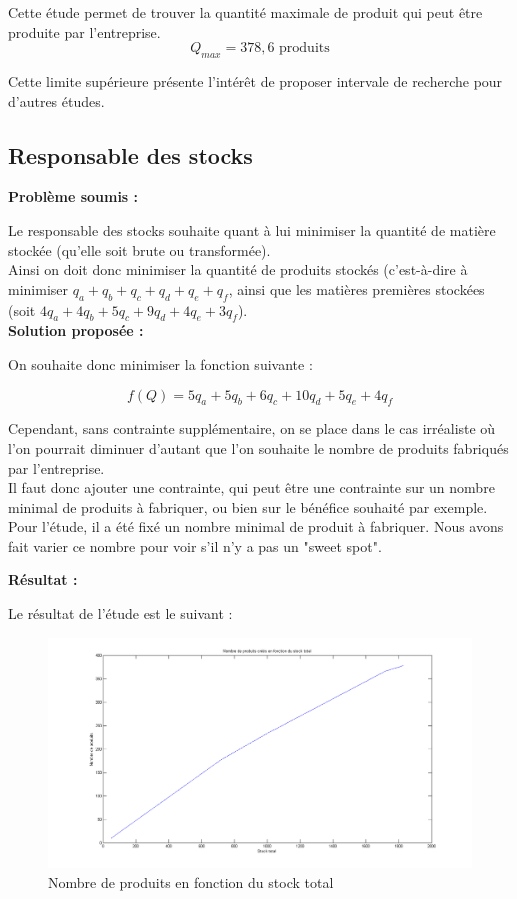 \documentclass[paper=a4, fontsize=11pt]{scrartcl}
\numberwithin{equation}{section}		%
\numberwithin{figure}{section}			%
\numberwithin{table}{section}				%
\renewcommand{\bf}[1]{\textbf{#1}}
\begin{document}
Cette étude permet de trouver la quantité maximale de produit qui peut être produite par l'entreprise.
\[ Q_{max} = 378,6 \text{ produits}\]

Cette limite supérieure présente l'intérêt de proposer intervale de recherche pour d'autres études.


\subsection{Responsable des stocks}
\bf{Problème soumis :}

Le responsable des stocks souhaite quant à lui minimiser la quantité de matière stockée (qu'elle soit brute ou transformée).\\

Ainsi on doit donc minimiser la quantité de produits stockés (c'est-à-dire à minimiser $q_a + q_b + q_c + q_d + q_e + q_f$, ainsi que les matières premières stockées (soit $4q_a + 4q_b + 5q_c + 9q_d + 4q_e + 3q_f$).
\\

\bf{Solution proposée :}

On souhaite donc minimiser la fonction suivante : 

\[ f(Q) = 5q_a + 5q_b + 6q_c + 10q_d + 5q_e + 4q_f \]

Cependant, sans contrainte supplémentaire, on se place dans le cas irréaliste où l'on pourrait diminuer d'autant que l'on souhaite le nombre de produits fabriqués par l'entreprise.\\
Il faut donc ajouter une contrainte, qui peut être une contrainte sur un nombre minimal de produits à fabriquer, ou bien sur le bénéfice souhaité par exemple.\\
Pour l'étude, il a été fixé un nombre minimal de produit à fabriquer. Nous avons fait varier ce nombre pour voir s'il n'y a pas un "sweet spot".

\bf{Résultat :}

Le résultat de l'étude est le suivant : 

\begin{figure}[H]
\caption{Nombre de produits en fonction du stock total \label{figstock}}
\centering
\includegraphics[width=16cm]{figures/nbProduitsFctStockTotal.png}
\end{figure}
\end{document}
